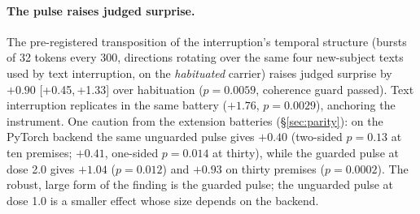 \documentclass[11pt]{article}
\newcommand{\ci}[2]{[#1,\,#2]}
\begin{document}
\paragraph{The pulse raises judged surprise.} The
pre-registered transposition of the interruption's temporal structure
(bursts of 32 tokens every 300, directions rotating over the same
four new-subject texts used by text interruption, on the
\emph{habituated} carrier) raises judged surprise by $+0.90$
\ci{+0.45}{+1.33} over habituation ($p=0.0059$, coherence guard
passed). Text interruption replicates in the same battery ($+1.76$,
$p=0.0029$), anchoring the instrument. One caution from the extension
batteries (\S\ref{sec:parity}): on the PyTorch backend the same
unguarded pulse gives $+0.40$ (two-sided $p=0.13$ at ten premises;
$+0.41$, one-sided $p=0.014$ at thirty), while the guarded pulse at
dose 2.0 gives $+1.04$ ($p=0.012$) and $+0.93$ on thirty premises
($p=0.0002$). The robust,
large form of the finding is the guarded pulse; the unguarded pulse at
dose 1.0 is a smaller effect whose size depends on the backend.
\end{document}
